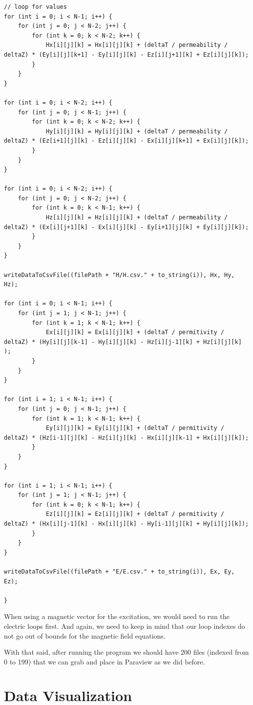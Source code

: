 \begin{verbatim}
// loop for values
for (int i = 0; i < N-1; i++) {
	for (int j = 0; j < N-2; j++) {
		for (int k = 0; k < N-2; k++) {
			Hx[i][j][k] = Hx[i][j][k] + (deltaT / permeability / deltaZ) * (Ey[i][j][k+1] - Ey[i][j][k] - Ez[i][j+1][k] + Ez[i][j][k]);
		}
	}
}

for (int i = 0; i < N-2; i++) {
	for (int j = 0; j < N-1; j++) {
		for (int k = 0; k < N-2; k++) {
			Hy[i][j][k] = Hy[i][j][k] + (deltaT / permeability / deltaZ) * (Ez[i+1][j][k] - Ez[i][j][k] - Ex[i][j][k+1] + Ex[i][j][k]);
		}
	}
}

for (int i = 0; i < N-2; i++) {
	for (int j = 0; j < N-2; j++) {
		for (int k = 0; k < N-1; k++) {
			Hz[i][j][k] = Hz[i][j][k] + (deltaT / permeability / deltaZ) * (Ex[i][j+1][k] - Ex[i][j][k] - Ey[i+1][j][k] + Ey[i][j][k]);
		}
	}
}

writeDataToCsvFile((filePath + "H/H.csv." + to_string(i)), Hx, Hy, Hz);

for (int i = 0; i < N-1; i++) {
	for (int j = 1; j < N-1; j++) {
		for (int k = 1; k < N-1; k++) {
			Ex[i][j][k] = Ex[i][j][k] + (deltaT / permitivity / deltaZ) * (Hy[i][j][k-1] - Hy[i][j][k] - Hz[i][j-1][k] + Hz[i][j][k] );
		}
	}
}

for (int i = 1; i < N-1; i++) {
	for (int j = 0; j < N-1; j++) {
		for (int k = 1; k < N-1; k++) {
			Ey[i][j][k] = Ey[i][j][k] + (deltaT / permitivity / deltaZ) * (Hz[i-1][j][k] - Hz[i][j][k] - Hx[i][j][k-1] + Hx[i][j][k]);
		}
	}
}

for (int i = 1; i < N-1; i++) {
	for (int j = 1; j < N-1; j++) {
		for (int k = 0; k < N-1; k++) {
			Ez[i][j][k] = Ez[i][j][k] + (deltaT / permitivity / deltaZ) * (Hx[i][j-1][k] - Hx[i][j][k] - Hy[i-1][j][k] + Hy[i][j][k]);
		}
	}
}

writeDataToCsvFile((filePath + "E/E.csv." + to_string(i)), Ex, Ey, Ez);

}
\end{verbatim}

When using a magnetic vector for the excitation, we would need to run the electric loops first. And again, we need to keep in mind that our loop indexes do not go out of bounds for the magnetic field equations.

With that said, after running the program we should have 200 files (indexed from 0 to 199) that we can grab and place in Paraview as we did before.

\section{Data Visualization}

